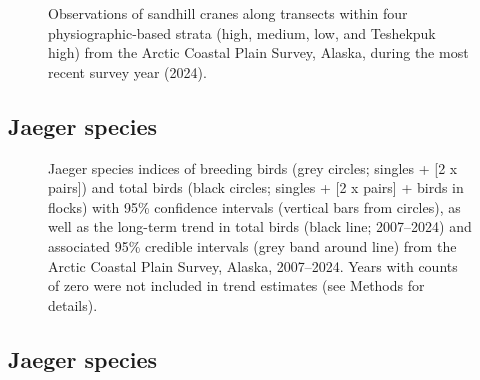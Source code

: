 \documentclass[
]{article}
\begin{document}
\begin{figure}


\caption{\label{fig-SACRmap}Observations of sandhill cranes along
transects within four physiographic-based strata (high, medium, low, and
Teshekpuk high) from the Arctic Coastal Plain Survey, Alaska, during the
most recent survey year (2024).}

\end{figure}%

\newpage{}

\subsection*{Jaeger species}\label{jaeger-species}

\begin{figure}


\caption{\label{fig-JAEG}Jaeger species indices of breeding birds (grey
circles; singles + {[}2 x pairs{]}) and total birds (black circles;
singles + {[}2 x pairs{]} + birds in flocks) with 95\% confidence
intervals (vertical bars from circles), as well as the long-term trend
in total birds (black line; 2007--2024) and associated 95\% credible
intervals (grey band around line) from the Arctic Coastal Plain Survey,
Alaska, 2007--2024. Years with counts of zero were not included in trend
estimates (see Methods for details).}

\end{figure}%

\newpage{}

\subsection*{Jaeger species}\label{jaeger-species-1}

\begingroup\fontsize{10}{12}\selectfont
\end{document}
